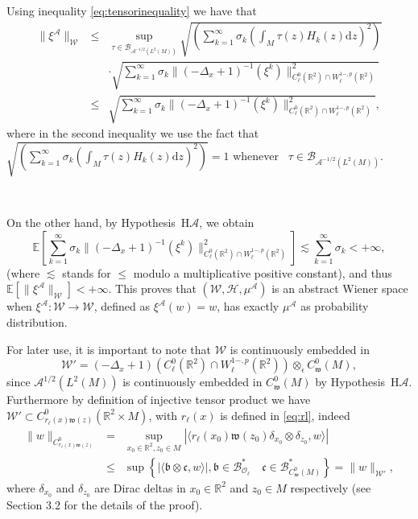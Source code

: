 \documentclass[a4paper,10pt]{article}
\newcommand{\asterisk}{\mathord{*}}
\newcommand{\mathd}{\mathrm{d}}
\begin{document}
Using inequality {\eqref{eq:tensorinequality}} we have that
\begin{eqnarray}
  \| \xi^{\mathcal{A}} \|_{\mathcal{W}} & \leqslant & \sup_{\tau \in
  \mathcal{B}_{\mathcal{A}^{- 1 / 2} (L^2 (M))}} \sqrt{\left( \sum_{k =
  1}^{\infty} \sigma_k \left( \int_M \tau (z) H_k (z) \mathd z \right)^2
  \right)} \nonumber\\
  &  & \cdot \sqrt{\sum^{\infty}_{k = 1} \sigma_k \| (- \Delta_x + 1)^{- 1} (\xi^k)
  \|^2_{C^0_{\ell} (\mathbb{R}^2) \cap W^{1 -, p}_{\ell} (\mathbb{R}^2)}}
  \nonumber\\
  & \leq & \sqrt{\sum^{\infty}_{k = 1} \sigma_k \| (- \Delta_x + 1)^{- 1}
  (\xi^k) \|^2_{C^0_{\ell} (\mathbb{R}^2) \cap W^{1 -, p}_{\ell}
  (\mathbb{R}^2)}}, 
\end{eqnarray}
where in the second inequality we use the fact that $\sqrt{\left( \sum_{k =
1}^{\infty} \sigma_k \left( \int_M \tau (z) H_k (z) \mathd z \right)^2
\right)} = 1$ whenever \ $\tau \in \mathcal{B}_{\mathcal{A}^{- 1 / 2} (L^2
(M))}$.

\

On the other hand, by Hypothesis~H$\mathcal{A}$, we obtain
\[ \mathbb{E} \left[ \sum^{\infty}_{k = 1} \sigma_k \| (- \Delta_x + 1)^{- 1}
   (\xi^k) \|^2_{C^0_{\ell} (\mathbb{R}^2) \cap W^{1 -, p}_{\ell}
   (\mathbb{R}^2)} \right] \lesssim \sum_{k = 1}^{\infty} \sigma_k < + \infty,
\]
(where $\lesssim$ stands for $\leqslant$ modulo a multiplicative positive
constant), and thus $\mathbb{E} [\| \xi^{\mathcal{A}} \|_{\mathcal{W}}] < +
\infty$. This proves that $(\mathcal{W}, \mathcal{H}, \mu^{\mathcal{A}})$ is
an abstract Wiener space when $\xi^{\mathcal{A}} : \mathcal{W} \rightarrow
\mathcal{W}$, defined as $\xi^{\mathcal{A}} (w) = w$, has exactly
$\mu^{\mathcal{A}}$ as probability distribution.

For later use, it is important to note that $\mathcal{W}$ is continuously
embedded in
\[ \mathcal{W}' = (- \Delta_x + 1) (C^0_{\ell} (\mathbb{R}^2) \cap W^{1 -,
   p}_{\ell} (\mathbb{R}^2)) \otimes_{\epsilon} C^0_{\mathfrak{w}} (M), \]
since $\mathcal{A}^{1 / 2} (L^2 (M))$ is continuously embedded in
$C^0_{\mathfrak{w}} (M)$ by Hypothesis~H$\mathcal{A}$. Furthermore by
definition of injective tensor product we have $\mathcal{W}' \subset
C^0_{r_{\ell} (x) \mathfrak{w} (z)} (\mathbb{R}^2 \times M)$, with $r_{\ell}
(x)$ is defined in {\eqref{eq:rl}}, indeed
\begin{eqnarray}
  \| w \|_{C^0_{r_{\ell} (x) \mathfrak{w} (z)}} & = & \sup_{x_0 \in
  \mathbb{R}^2, z_0 \in M} | \langle r_{\ell} (x_0) \mathfrak{w} (z_0)
  \delta_{x_0} \otimes \delta_{z_0}, w \rangle | \nonumber\\
  & \leqslant & \sup \left\{ | \langle \mathfrak{b} \otimes \mathfrak{c}, w
  \rangle |, \mathfrak{b} \in \mathcal{B}_{\mathcal{O}_{\ell}}^{\asterisk}
  \quad \mathfrak{c} \in \mathcal{B}_{C^0_{\mathfrak{w}} (M)}^{\asterisk}
  \right\} = \| w \|_{\mathcal{W}'}, \nonumber
\end{eqnarray}
where $\delta_{x_0}$ and $\delta_{z_0}$ are Dirac deltas in $x_0 \in
\mathbb{R}^2$ and $z_0 \in M$ respectively (see~{\cite{Ryan2002}} Section 3.2
for the details of the proof).
\end{document}
